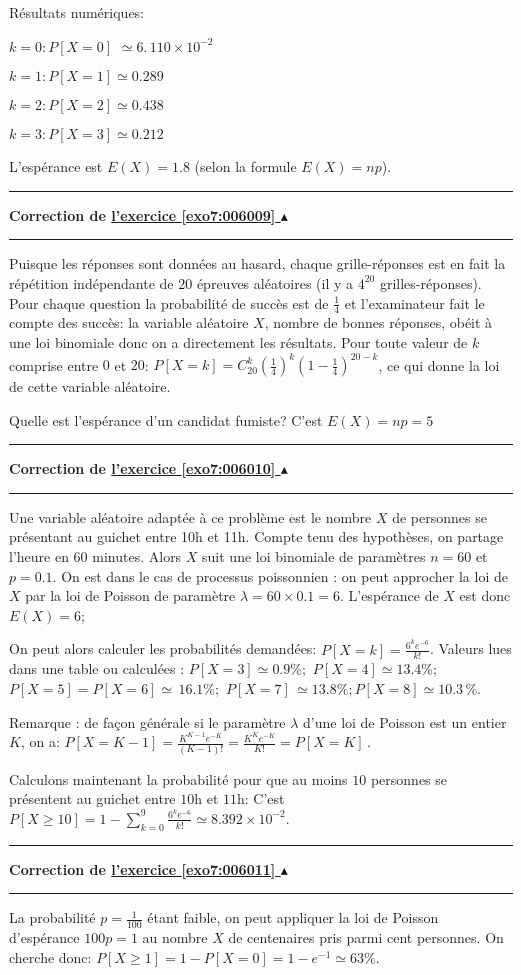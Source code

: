 \documentclass[11pt,a4paper]{article}
\newcounter{exo}
\newcommand{\correction}[1]{\hypertarget{cor7:#1}{}\label{cor7:#1}{\bf Correction de \hyperlink{exo7:#1}{l'exercice \ref{exo7:#1} $\blacktriangle$}}\vspace{1mm}\hrule\vspace{1mm}}
\newcommand{\fincorrection}{\vspace{1mm}\hrule\vspace*{7mm}}
\begin{document}
Résultats numériques:

$k=0:P[X=0]$ $\simeq 6.\,110\times 10^{-2}$

$k=1:P[X=1] \simeq 0.289\,$

$k=2:P[X=2]\simeq 0.438$

$k=3:P[X=3] \simeq 0.212$

L'espérance est $E(X)=1.8$ (selon la formule $E(X)=np$).
\fincorrection
\correction{006009}
Puisque les réponses sont données au hasard, chaque grille-réponses est en fait la 
répétition indépendante de $20$ épreuves aléatoires (il y a $4^{20}$ grilles-réponses). 
Pour chaque question la probabilité de succès est de $\frac{1}{4}$ et
l'examinateur fait le compte des succès: la variable aléatoire $X$,
nombre de bonnes réponses, obéit à une loi binomiale donc on a
directement les résultats.
Pour toute valeur de $k$ comprise entre $0$ et $20$:
$P[X=k]=C_{20}^{k}(\frac{1}{4})^{k}(1-\frac{1}{4})^{20-k}$, ce qui
donne la loi de cette variable aléatoire.

Quelle est l'espérance d'un candidat fumiste? C'est $E(X)=np=5$
\fincorrection
\correction{006010}
Une variable aléatoire adaptée à ce problème est le nombre $X$ de personnes 
se présentant au guichet entre 10h et 11h. Compte tenu
des hypothèses, on partage l'heure en $60$ minutes. Alors $X$ suit une
loi binomiale de paramètres $n=60$ et $p=0.1$. On est dans le cas de
processus poissonnien : on peut approcher la loi de $X$ par la loi de
Poisson de paramètre $\lambda =60\times 0.1=6$.
L'espérance de $X$ est donc $E(X)=6$;

On peut alors calculer les probabilités demandées:
$P[X=k]=\frac{6^{k}e^{-6}}{k!}$. Valeurs lues dans une table ou calculées :
$P[X=3]\simeq 0.9\%;$ $P[X=4]\simeq 13.4\%;$ $P[X=5]=P[X=6]\simeq
\,16.1\%;$
$P[X=7]\,\simeq 13.8\%;P[X=8]\simeq 10.3\,\%.$

Remarque : de façon générale si le paramètre 
$\lambda$ d'une loi de Poisson est un entier $K$, on a:
$P[X=K-1]=\frac{K^{K-1}e^{-K}}{(K-1)!}=\frac{K^{K}e^{-K}}{K!}=P[X=K]\,.$

Calculons maintenant la probabilité pour que au moins $10$
personnes se présentent au guichet entre $10$h et $11$h: C'est $P[X\geq
10]=1-\sum_{k=0}^{9}\frac{6^{k}e^{-6}}{k!}\simeq 8.392\times
10^{-2}.$

\fincorrection
\correction{006011}
La probabilité $p=\frac{1}{100}$ étant faible, on peut appliquer la
loi de Poisson d'espérance $100p=1$ au nombre $X$ de centenaires pris
parmi cent personnes. On cherche donc: $P[X\geq 1]=1-P[X=0]=1-e^{-1}\simeq
63\%$.
\end{document}

